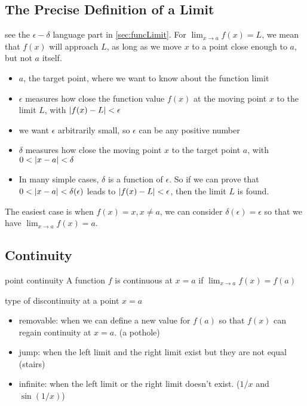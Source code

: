 \documentclass[Calculus 1 Recitation.tex]{subfiles}
\begin{document}
\subsection{The Precise Definition of a Limit}

see the $\epsilon-\delta$ language part in \autoref{sec:funcLimit}. For $\lim_{x\to a}f(x)=L$, we mean that $f(x)$ will approach $L$, as long as we move $x$ to a point close enough to $a$, but not $a$ itself.

\begin{itemize}
	\item $a$, the target point, where we want to know about the function limit
	\item $\epsilon$ measures how close the function value $f(x)$ at the moving point $x$ to the limit $L$, with $\left\vert f(x)-L\right\vert<\epsilon$
	\item  we want $\epsilon$ arbitrarily small, so $\epsilon$ can be any positive number
	\item $\delta$ measures how close the moving point $x$ to the target point $a$, with $0<\left\vert x-a\right\vert<\delta$
	\item In many simple cases, $\delta$ is a function of $\epsilon$. So if we can prove that $0<\left\vert x-a\right\vert<\delta(\epsilon)$ leads to $\left\vert f(x)-L\right\vert<\epsilon$, then the limit $L$ is found.
\end{itemize}

The easiest case is when $f(x)=x, x\neq a$, we can consider $\delta(\epsilon)=\epsilon$ so that we have $\lim_{x\to a} f(x)=a$.

\subsection{Continuity}

\begin{myleftlinebox}
	point continuity
	\tcblower
	A function $f$ is continuous at $x=a$ if $\lim_{x\to a} f(x) = f(a)$
\end{myleftlinebox}

\begin{myleftlinebox}
	type of discontinuity at a point $x=a$
	\tcblower
	\begin{itemize}
		\item removable: when we can define a new value for $f(a)$ so that $f(x)$ can regain continuity at $x=a$. (a pothole)
		\item jump: when the left limit and the right limit exist but they are not equal (stairs)
		\item infinite: when the left limit or the right limit doesn't exist. ($1/x$ and $\sin(1/x)$)
	\end{itemize}
\end{myleftlinebox}
\end{document}
